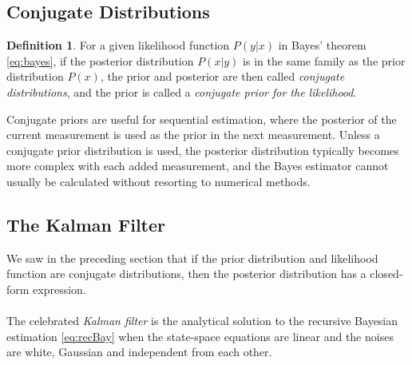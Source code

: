 \documentclass{article}
\theoremstyle{definition}
\newtheorem{definition}[thm]{Definition}
\theoremstyle{remark}
\begin{document}
\subsection{Conjugate Distributions}

\begin{definition}
For a given likelihood function $P(y|x)$ in Bayes' theorem \eqref{eq:bayes}, if the posterior distribution $P(x|y)$ is in the same family as the prior distribution $P(x)$, the prior and posterior are then called \emph{conjugate distributions}, and the prior is called a \emph{conjugate prior for the likelihood}. 
\end{definition}

Conjugate priors are useful for sequential estimation, where the posterior of the current measurement is used as the prior in the next measurement. Unless a conjugate prior distribution is used, the posterior distribution typically becomes more complex with each added measurement, and the Bayes estimator cannot usually be calculated without resorting to numerical methods.









\subsection{The Kalman Filter}
We saw in the preceding section that if the prior distribution and likelihood function are conjugate distributions, then the  posterior distribution has a closed-form expression.\\
\\
The celebrated \emph{Kalman filter} is the analytical solution to the recursive Bayesian estimation \eqref{eq:recBay} when the state-space equations are linear and the noises are white, Gaussian and independent from each other.
\end{document}
